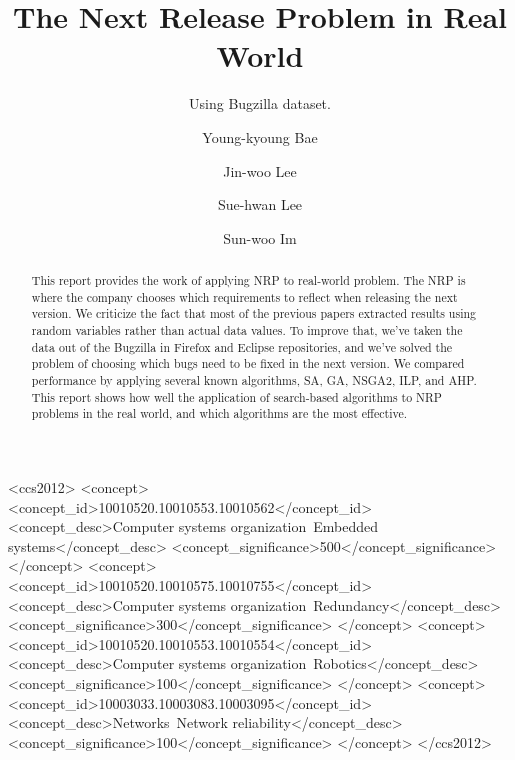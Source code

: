 \documentclass[sigconf]{acmart}
\begin{document}
\title{The Next Release Problem in Real World}
\subtitle{Using Bugzilla dataset.}


\author{Young-kyoung Bae}


\author{Jin-woo Lee}

\author{Sue-hwan Lee}

\author{Sun-woo Im}


\begin{abstract}
This report provides the work of applying NRP to real-world problem. The NRP is where the company chooses which requirements to reflect when releasing the next version. We criticize the fact that most of the previous papers extracted results using random variables rather than actual data values. To improve that, we've taken the data out of the Bugzilla in Firefox and Eclipse repositories, and we've solved the problem of choosing which bugs need to be fixed in the next version. We compared performance by applying several known algorithms, SA, GA, NSGA2, ILP, and AHP. This report shows how well the application of search-based algorithms to NRP problems in the real world, and which algorithms are the most effective.
\end{abstract}

%
%
\begin{CCSXML}
<ccs2012>
 <concept>
  <concept_id>10010520.10010553.10010562</concept_id>
  <concept_desc>Computer systems organization~Embedded systems</concept_desc>
  <concept_significance>500</concept_significance>
 </concept>
 <concept>
  <concept_id>10010520.10010575.10010755</concept_id>
  <concept_desc>Computer systems organization~Redundancy</concept_desc>
  <concept_significance>300</concept_significance>
 </concept>
 <concept>
  <concept_id>10010520.10010553.10010554</concept_id>
  <concept_desc>Computer systems organization~Robotics</concept_desc>
  <concept_significance>100</concept_significance>
 </concept>
 <concept>
  <concept_id>10003033.10003083.10003095</concept_id>
  <concept_desc>Networks~Network reliability</concept_desc>
  <concept_significance>100</concept_significance>
 </concept>
</ccs2012>
\end{CCSXML}


\maketitle





\end{document}
